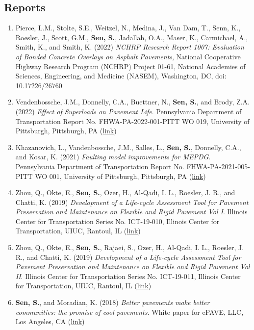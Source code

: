 \documentclass[12pt]{article}
\begin{document}
\hfill
\subsection*{Reports}
\begin{enumerate}[label=(R\arabic*)]
	\item Pierce, L.M., Stolte, S.E., Weitzel, N., Medina, J., Van Dam, T., Senn, K., Roesler, J., Scott, G.M., \textbf{Sen, S.}, Jadallah, O.A., Maser, K., Carmichael, A., Smith, K., and Smith, K. (2022) \textit{NCHRP Research Report 1007: Evaluation of Bonded Concrete Overlays on Asphalt Pavements}, National Cooperative Highway Research Program (NCHRP) Project 01-61, National Academies of Sciences, Engineering, and Medicine (NASEM), Washington, DC, doi: \href{http://doi.org/10.17226/26760}{10.17226/26760}
	\item Vendenbossche, J.M., Donnelly, C.A., Buettner, N., \textbf{Sen, S.}, and Brody, Z.A. (2022) \textit{Effect of Superloads on Pavement Life}. Pennsylvania Department of Transportation Report No. FHWA-PA-2022-001-PITT WO 019, University of Pittsburgh, Pittsburgh, PA (\href{https://www.penndot.pa.gov/ProjectAndPrograms/Planning/Research-And-Implementation/Documents/Superload\%20Effect\%20on\%20Pavement\%20Life.pdf}{link})
	\item Khazanovich, L., Vandenbossche, J.M., Salles, L., \textbf{Sen, S.}, Donnelly, C.A., and Kosar, K. (2021) \textit{Faulting model improvements for MEPDG}. Pennsylvania Department of Transportation Report No. FHWA-PA-2021-005-PITT WO 001, University of Pittsburgh, Pittsburgh, PA (\href{https://www.penndot.pa.gov/ProjectAndPrograms/Planning/Research-And-Implementation/Documents/Faulting\%20Model\%20Improvements\%20for\%20MEPDG.pdf}{link})
	\item Zhou, Q., Okte, E., \textbf{Sen, S.}, Ozer, H., Al-Qadi, I. L., Roesler, J. R., and Chatti, K. (2019) \textit{Development of a Life-cycle Assessment Tool for Pavement Preservation and Maintenance on Flexible and Rigid Pavement Vol I}. Illinois Center for Transportation Series No. ICT-19-010, Illinois Center for Transportation, UIUC, Rantoul, IL (\href{https://apps.ict.illinois.edu/projects/getfile.asp?id=8865}{link})
	\item Zhou, Q., Okte, E., \textbf{Sen, S.}, Rajaei, S., Ozer, H., Al-Qadi, I. L., Roesler, J. R., and Chatti, K. (2019) \textit{Development of a Life-cycle Assessment Tool for Pavement Preservation and Maintenance on Flexible and Rigid Pavement Vol II}. Illinois Center for Transportation Series No. ICT-19-011, Illinois Center for Transportation, UIUC, Rantoul, IL (\href{https://apps.ict.illinois.edu/projects/getfile.asp?id=8866}{link})
	\item \textbf{Sen, S.}, and Moradian, K. (2018) \textit{Better pavements make better communities: the promise of cool pavements.} White paper for ePAVE, LLC, Los Angeles, CA (\href{http://www.epavellc.com/wp-content/uploads/ePAVE-White-Paper.pdf}{link})
\end{enumerate}
\end{document}
